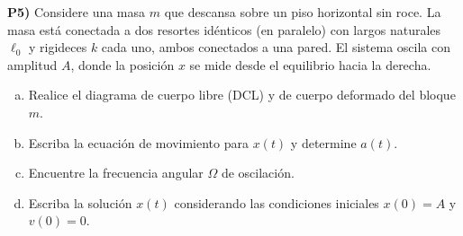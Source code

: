 \textbf{P5)} Considere una masa $m$ que descansa sobre un piso horizontal sin roce. La masa está conectada a dos resortes idénticos (en paralelo) con largos naturales $\ell_0$ y rigideces $k$ cada uno, ambos conectados a una pared. El sistema oscila con amplitud $A$, donde la posición $x$ se mide desde el equilibrio hacia la derecha.

\begin{enumerate}[a)]
\item Realice el diagrama de cuerpo libre (DCL) y de cuerpo deformado del bloque $m$.
\item Escriba la ecuación de movimiento para $x(t)$ y determine $a(t)$.
\item Encuentre la frecuencia angular $\Omega$ de oscilación.
\item Escriba la solución $x(t)$ considerando las condiciones iniciales $x(0) = A$ y $v(0) = 0$.
\end{enumerate}

